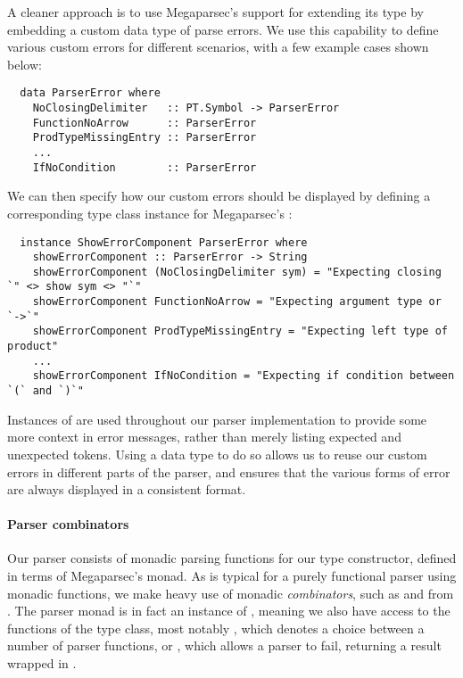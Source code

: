 A cleaner approach is to use Megaparsec's support for extending its
 type by embedding a custom data type of parse errors.
We use this capability to define various custom errors for different scenarios,
with a few example cases shown below:
%
\begin{verbatim}
  data ParserError where
    NoClosingDelimiter   :: PT.Symbol -> ParserError
    FunctionNoArrow      :: ParserError
    ProdTypeMissingEntry :: ParserError
    ...
    IfNoCondition        :: ParserError
\end{verbatim}

We can then specify how our custom errors should be displayed by defining a
corresponding type class instance for Megaparsec's :
%
\begin{verbatim}
  instance ShowErrorComponent ParserError where
    showErrorComponent :: ParserError -> String
    showErrorComponent (NoClosingDelimiter sym) = "Expecting closing `" <> show sym <> "`"
    showErrorComponent FunctionNoArrow = "Expecting argument type or `->`"
    showErrorComponent ProdTypeMissingEntry = "Expecting left type of product"
    ...
    showErrorComponent IfNoCondition = "Expecting if condition between `(` and `)`"
\end{verbatim}

Instances of  are used throughout our parser implementation
to provide some more context in error messages, rather than merely listing
expected and unexpected tokens.
Using a data type to do so allows us to reuse our custom errors in different
parts of the parser, and ensures that the various forms of error are always
displayed in a consistent format.


\paragraph{Parser combinators}
Our parser consists of monadic parsing functions for our 
type constructor, defined in terms of Megaparsec's  monad.
As is typical for a purely functional parser using monadic functions, we make
heavy use of monadic \emph{combinators}, such as  and
 from .
The parser monad is in fact an instance of , meaning we also
have access to the functions of the  type class, most
notably \code{<|>}, which denotes a choice between a number of parser
functions, or , which allows a parser to fail, returning a
result wrapped in .

